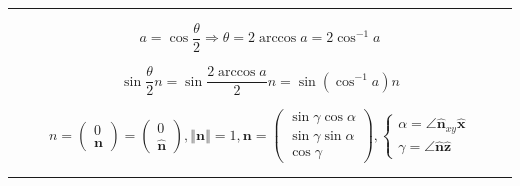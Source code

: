 \documentclass[
]{book}
\theoremstyle{definition}
\theoremstyle{definition}
\theoremstyle{definition}
\theoremstyle{definition}
\theoremstyle{remark}
\begin{document}
\begin{center}\rule{0.5\linewidth}{0.5pt}\end{center}

\[
a=\cos\dfrac{\theta}{2}\Rightarrow\theta=2\arccos a=2\cos^{-1}a
\]

\[
\sin\dfrac{\theta}{2}n=\sin\dfrac{2\arccos a}{2}n=\sin\left(\cos^{-1}a\right)n
\]

\[
n=\begin{pmatrix}0\\
\boldsymbol{n}
\end{pmatrix}=\begin{pmatrix}0\\
\hat{\boldsymbol{n}}
\end{pmatrix},\left\Vert \boldsymbol{n}\right\Vert =1,\boldsymbol{n}=\begin{pmatrix}\sin\gamma\cos\alpha\\
\sin\gamma\sin\alpha\\
\cos\gamma
\end{pmatrix},\begin{cases}
\alpha=\angle\hat{\boldsymbol{n}}_{{\scriptscriptstyle xy}}\hat{\boldsymbol{x}}\\
\gamma=\angle\hat{\boldsymbol{n}}\hat{\boldsymbol{z}}
\end{cases}
\]

\begin{center}\rule{0.5\linewidth}{0.5pt}\end{center}
\end{document}
